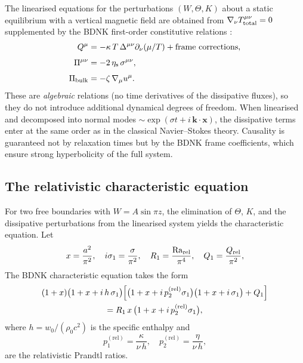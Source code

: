 The linearised equations for the perturbations
$(W, \Theta, K)$
about a static equilibrium with a vertical magnetic field are obtained
from $\nabla_{\nu} T^{\mu\nu}_{\mathrm{total}} = 0$ supplemented by the
BDNK first-order constitutive relations
\citep{BemficaDN2018,Kovtun2019,HoultKovtun2020}:
\begin{align}
  Q^{\mu}
  &= -\kappa\,T\,\Delta^{\mu\nu}\partial_{\nu}(\mu/T)
     + \text{frame corrections} ,
  \label{eq:rel-BDNK-heat}\\[4pt]
  \Pi^{\mu\nu}
  &= -2\,\eta_{\mathrm{s}}\,\sigma^{\mu\nu} ,
  \label{eq:rel-BDNK-shear}\\[4pt]
  \Pi_{\mathrm{bulk}}
  &= -\zeta\,\nabla_{\mu}u^{\mu} .
  \label{eq:rel-BDNK-bulk}
\end{align}
These are \emph{algebraic} relations (no time derivatives of the
dissipative fluxes), so they do not introduce additional dynamical
degrees of freedom.  When linearised and decomposed into normal modes
$\sim \exp(\sigma t + i\,\mathbf{k}\cdot\mathbf{x})$, the dissipative
terms enter at the same order as in the classical Navier--Stokes theory.
Causality is guaranteed not by relaxation times but by the BDNK frame
coefficients, which ensure strong hyperbolicity of the full system.

\subsection{The relativistic characteristic equation}
\label{subsec:rel-46-chareq}

For two free boundaries with $W = A\sin\pi z$, the elimination of
$\Theta$, $K$, and the dissipative perturbations from the linearised
system yields the characteristic equation.  Let
\begin{equation}
  x = \frac{a^{2}}{\pi^{2}},\quad
  i\sigma_{1} = \frac{\sigma}{\pi^{2}},\quad
  R_{1} = \frac{\mathrm{Ra}_{\mathrm{rel}}}{\pi^{4}},\quad
  Q_{1} = \frac{Q_{\mathrm{rel}}}{\pi^{2}},
  \label{eq:rel-scaled-vars}
\end{equation}
The BDNK characteristic equation takes the form
\begin{multline}
  (1+x)\bigl(1+x+i\,h\,\sigma_{1}\bigr)
  \Bigl[\bigl(1+x+i\,p_{2}^{(\mathrm{rel})}\sigma_{1}\bigr)
        \bigl(1+x+i\,\sigma_{1}\bigr)
  + Q_{1}\Bigr] \\
  = R_{1}\,x\,
    \bigl(1+x+i\,p_{2}^{(\mathrm{rel})}\sigma_{1}\bigr) ,
  \label{eq:rel-char-full}
\end{multline}
where $h = w_{0}/(\rho_{0}c^{2})$ is the specific enthalpy and
\begin{equation}
  p_{1}^{(\mathrm{rel})} = \frac{\kappa}{\nu\,h} ,\quad
  p_{2}^{(\mathrm{rel})} = \frac{\eta}{\nu\,h} ,
  \label{eq:rel-p1p2}
\end{equation}
are the relativistic Prandtl ratios.

